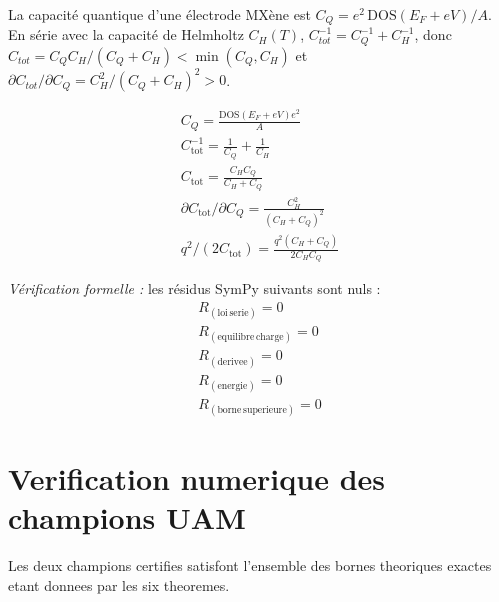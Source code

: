 \documentclass[11pt,a4paper,french]{article}
\begin{document}
La capacité quantique d'une électrode MXène est $C_Q=e^2\,\mathrm{DOS}(E_F+eV)/A$. En série avec la capacité de Helmholtz $C_H(T)$, $C_{tot}^{-1}=C_Q^{-1}+C_H^{-1}$, donc $C_{tot}=C_QC_H/(C_Q+C_H)<\min(C_Q,C_H)$ et $\partial C_{tot}/\partial C_Q=C_H^2/(C_Q+C_H)^2>0$.

\begin{align}
C_Q = \frac{\mathrm{DOS}(E_F+eV) e^{2}}{A} \\
C_{\mathrm{tot}}^{-1} = \frac{1}{C_Q} + \frac{1}{C_H} \\
C_{\mathrm{tot}} = \frac{C_H C_Q}{C_H + C_Q} \\
\partial C_{\mathrm{tot}}/\partial C_Q = \frac{C_H^{2}}{\left(C_H + C_Q\right)^{2}} \\
q^2/(2C_{\mathrm{tot}}) = \frac{q^{2} \left(C_H + C_Q\right)}{2 C_H C_Q}
\end{align}

\noindent\emph{Vérification formelle :} les résidus SymPy suivants sont nuls :
\begin{align}
R_{(\mathrm{loi\, serie})} = 0 \\
R_{(\mathrm{equilibre\, charge})} = 0 \\
R_{(\mathrm{derivee})} = 0 \\
R_{(\mathrm{energie})} = 0 \\
R_{(\mathrm{borne\, superieure})} = 0
\end{align}

\section{Verification numerique des champions UAM}

Les deux champions certifies satisfont l'ensemble des bornes theoriques exactes etant donnees par les six theoremes.
\end{document}
